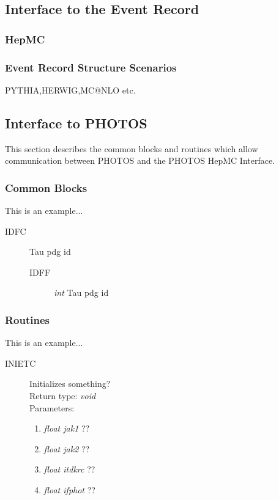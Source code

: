 \documentclass[]{Photos_interface_design}
\begin{document}
\subsection{Interface to the Event Record}
\subsubsection{HepMC}
\subsubsection{Event Record Structure Scenarios}
PYTHIA,HERWIG,MC@NLO etc.

\subsection{Interface to PHOTOS}
This section describes the common blocks and routines which allow
communication between PHOTOS and the PHOTOS HepMC Interface.

\subsubsection{Common Blocks}

This is an example...

\begin{description}
\item[IDFC] Tau pdg id
    \begin{description}
    \item[IDFF] \textit{int} Tau pdg id
    \end{description}
\end{description}

\subsubsection{Routines}

This is an example...  

\begin{description}
\item[INIETC] Initializes something? \\
  Return type: \textit{void} \\
  Parameters:
  \begin{enumerate}
    \item \textit {float jak1} ??
    \item \textit {float jak2} ??
    \item \textit {float itdkrc} ??
    \item \textit {float ifphot} ??
  \end{enumerate}
\end{description}
\end{document}
